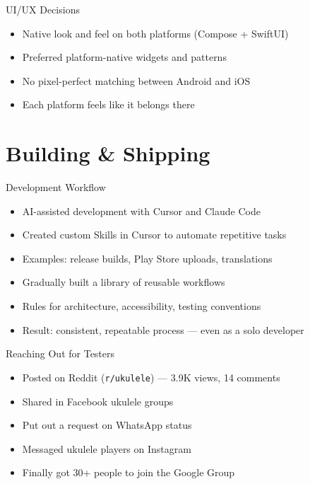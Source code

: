 \documentclass[aspectratio=169]{beamer}
\begin{document}
\begin{frame}{UI/UX Decisions}
  \begin{itemize}
    \item Native look and feel on both platforms (Compose + SwiftUI)
    \item Preferred platform-native widgets and patterns
    \item No pixel-perfect matching between Android and iOS
    \item Each platform feels like it belongs there
  \end{itemize}
\end{frame}

\section{Building \& Shipping}

\begin{frame}{Development Workflow}
  \begin{itemize}
    \item AI-assisted development with Cursor and Claude Code
    \item Created custom Skills in Cursor to automate repetitive tasks
    \item Examples: release builds, Play Store uploads, translations
    \item Gradually built a library of reusable workflows
    \item Rules for architecture, accessibility, testing conventions
    \item Result: consistent, repeatable process --- even as a solo developer
  \end{itemize}
\end{frame}

\begin{frame}{Reaching Out for Testers}
  \begin{itemize}
    \item Posted on Reddit (\texttt{r/ukulele}) --- 3.9K views, 14 comments
    \item Shared in Facebook ukulele groups
    \item Put out a request on WhatsApp status
    \item Messaged ukulele players on Instagram
    \item Finally got 30+ people to join the Google Group
  \end{itemize}
\end{frame}
\end{document}
